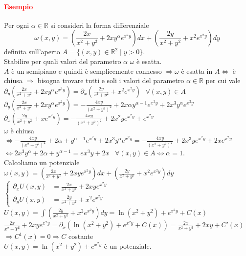 \documentclass{article}
\newcommand{\R}{\mathbb{R}}
\begin{document}
\paragraph{\textcolor{red}{Esempio}}
Per ogni $\alpha  \in \R$ si consideri la forma differenziale 
\begin{equation*}
    \omega (x,y)=\left(\frac{2x}{x^2+y^2}+2xy^\alpha e^{x^2y} \right) dx + \left( \frac{2y}{x^2+y^2}+x^2e^{x^2y} \right) dy
\end{equation*}
definita sull'aperto $A= \{ (x,y)\in \R^2 \mid y >0\}$. \\
Stabilire per quali valori del parametro $\alpha$ $\omega$ è esatta.\\
$A$ è un semipiano e quindi è semplicemente connesso $\Rightarrow \omega$ è esatta in $A \Leftrightarrow $ è chiusa $\Rightarrow$ bisogna trovare tutti e soli i valori del parametro $\alpha \in \R$ per cui vale $\partial_y\left( \frac{2x}{x^2+y^2}+2xy^\alpha e^{x^2y} \right) = \partial_x\left( \frac{2y}{x^2+y^2}+x^2e^{x^2y} \right)\,\,\,\, \forall (x,y)\in A$\\
$\partial_y\left( \frac{2x}{x^2+y^2} + 2xy^\alpha e^{x^2y} \right)=-\frac{4xy}{(x^2+y^2)^2}+2x\alpha y^{\alpha-1} e^{x^2y}+ 2x^3 y^\alpha e^{x^2y}$\\
$\partial_x\left( \frac{2y}{x^2+y^2}+xe^{x^2y} \right)=-\frac{4xy}{(x^2+y^2)^2}+2x^2 y e^{x^2 y}+e^{x^2y}$ \\
$\omega $ è chiusa $\Leftrightarrow -\frac{4xy}{(x^2+y^2)^2}+2\alpha + y^{\alpha-1}e^{x^2y}+2x^3y^\alpha e^{x^2y}= -\frac{4xy}{(x^2+y^2)^2} +2x^3 y e^{x^2y } + 2x e^{x^2y}$\\
$\Leftrightarrow 2x^3y^\alpha+ 2\alpha + y^{\alpha-1} = ex^3 y+ 2x$\,\,\, $\forall (x,y)\in A \Leftrightarrow \alpha=1$.\\
Calcoliamo un potenziale\\
$\omega(x,y)= \left(\frac{2x}{x^2+y^2} +2xy e^{x^2y}\right)dx+ \left( \frac{2y}{x^2+y^2}+x^2e^{x^2y} \right)dy$\\
$\begin{cases}
    \partial_xU(x,y)&=\frac{2x}{x^2+y^2}+2xy e^{x^2y} \\
    \partial_yU(x,y)&=\frac{2y}{x^2+y^2}+x^2e^{x^2y}
\end{cases}$\\
$U(x,y)=\int \left( \frac{2y}{x^2+y^2}+x^2e^{x^2y} \right)dy =\ln(x^2+y^2)+e^{x^2y}+C(x)$\\
$\frac{2x}{x^2+Y^2}+2xy e^{x^2y}=\partial_x\left( \ln(x^2+y^2) +e^{x^2y}+C(x)\right)=\frac{2x}{x^2+y^2}+2xy + C'(x)$\\
$\Rightarrow C^1 (x)=0 \Rightarrow  C$ costante\\
$U(x,y)=\ln (x^2+y^2) + e^{x^2y}$ è un potenziale.
\end{document}
